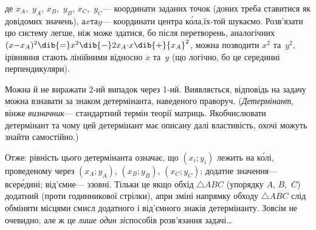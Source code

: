 \vspace{-0.25\baselineskip}

\noindent
де $x_A$,~$y_A$, $x_B$,~$y_B$, $x_C$,~$y_C$\nolinebreak[3] --- коор\-ди\-нати заданих точок (до\nolinebreak[3] них треба ставитися як до\nolinebreak[3] відомих значень), а\nolinebreak[3] $x$\nolinebreak[1] та\nolinebreak[3] $y$\nolinebreak[3] --- координати центра к\'{о}ла,\linebreak[1] їх-то\nolinebreak[1] й шукаємо. Розв'язати цю систему легше, ніж може здатися, бо після перетворень, аналогічних ${(x{-}x_A)^2}\dib{{=}}x^2\dib{{-}}2x_A{\cdot}x\dib{{+}}{x_A}^2$, можна позводити $x^2$ та~$y^2$, і\nolinebreak[3] рівняння стають лінійними відносно $x$ та~$y$ (що логічно, бо це серединні перпендикуляри).

Можна й не виражати \mbox{2-ий} випадок через \mbox{1-ий}. Виявляється, відповідь на задачу можна взнавати за знаком детермінанта, наведеного праворуч.
(\emph{Детермінант}, він\nolinebreak[3] же \emph{визначник}\nolinebreak[3] --- стандартний термін теорії матриць. Як\nolinebreak[3] обчислювати детермінант та чому цей детермінант має описану далі властивість, охочі можуть знайти 
самостійно.) 

Отже: рівність цього детермінанта означає, що ${(x_i;y_i)}$ лежить на к\'{о}лі, проведеному через ${(x_A;y_A)}$, ${(x_B;y_B)}$, ${(x_C;y_C)}$; додатне значення\nolinebreak[3] --- всер\'{е}дині; від'ємне\nolinebreak[3] --- ззовні. Тільки це якщо обхід $\triangle{}ABC$ (у\nolinebreak[3] порядку $A$, $B$,~$C$) додатний (проти годинникової стрілки), а\nolinebreak[3] при зміні напрямку обходу $\triangle{}ABC$ слід обміняти місцями смисл додатного і від'ємного знаків детермінанту. Зовсім не очевидно, але ж це \emph{лише один зі}\nolinebreak[3] способів розв'язання задачі\dots

